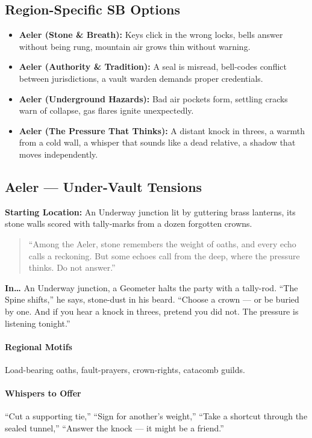 \subsection*{Region-Specific SB Options}
\begin{itemize}
\item \textbf{Aeler (Stone \& Breath):} Keys click in the wrong locks, bells answer without being rung, mountain air grows thin without warning.
\item \textbf{Aeler (Authority \& Tradition):} A seal is misread, bell-codes conflict between jurisdictions, a vault warden demands proper credentials.
\item \textbf{Aeler (Underground Hazards):} Bad air pockets form, settling cracks warn of collapse, gas flares ignite unexpectedly.
\item \textbf{Aeler (The Pressure That Thinks):} A distant knock in threes, a warmth from a cold wall, a whisper that sounds like a dead relative, a shadow that moves independently.
\end{itemize}

\subsection*{Aeler --- Under-Vault Tensions}
\textbf{Starting Location:} An Underway junction lit by guttering brass lanterns, its stone walls scored with tally-marks from a dozen forgotten crowns.
\begin{quote}
``Among the Aeler, stone remembers the weight of oaths, and every echo calls a reckoning. But some echoes call from the deep, where the pressure thinks. Do not answer.''
\end{quote}

\textbf{In\dots} An Underway junction, a Geometer halts the party with a tally-rod. ``The Spine shifts,'' he says, stone-dust in his beard. ``Choose a crown --- or be buried by one. And if you hear a knock in threes, pretend you did not. The pressure is listening tonight.''

\paragraph{Regional Motifs} Load-bearing oaths, fault-prayers, crown-rights, catacomb guilds.
\paragraph{Whispers to Offer} ``Cut a supporting tie,'' ``Sign for another's weight,'' ``Take a shortcut through the sealed tunnel,'' ``Answer the knock --- it might be a friend.''
